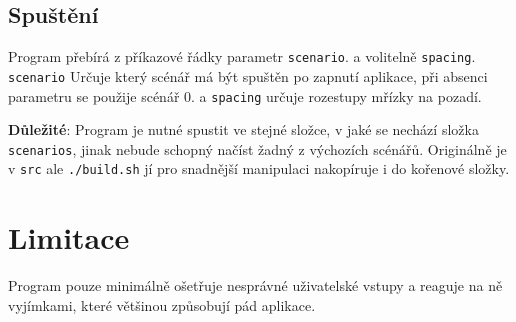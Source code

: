 \documentclass[12pt,a4paper]{paper}
\newcommand{\code}[1]{\texttt{#1}}
\begin{document}
\subsection{Spuštění}

Program přebírá z příkazové řádky parametr \code{scenario}. a volitelně
\code{spacing}. \code{scenario} Určuje který scénář má být spuštěn po zapnutí
aplikace, při absenci parametru se použije scénář 0. a \code{spacing} určuje
rozestupy mřízky na pozadí.

\textbf{Důležité}: Program je nutné spustit ve stejné složce, v jaké se nechází
složka \code{scenarios}, jinak nebude schopný načíst žadný z výchozích scénářů.
Originálně je v \code{src} ale \code{./build.sh} jí pro snadnější manipulaci 
nakopíruje i do kořenové složky.

\section{Limitace}

Program pouze minimálně ošetřuje nesprávné uživatelské vstupy a reaguje na ně
vyjímkami, které většinou způsobují pád aplikace. 
\end{document}
